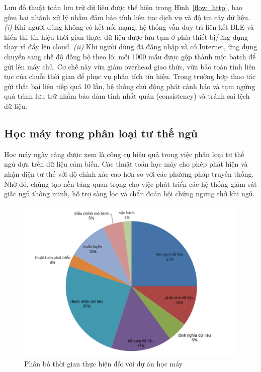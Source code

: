 Lưu đồ thuật toán lưu trữ dữ liệu được thể hiện trong Hình~\ref{flow_http}, bao gồm hai nhánh xử lý nhằm
đảm bảo tính liên tục dịch vụ và độ tin cậy dữ liệu. \textit{(i)} Khi người dùng không có kết nối
mạng, hệ thống vẫn duy trì liên kết BLE và hiển thị tín hiệu thời gian thực; dữ liệu được lưu tạm
ở phía thiết bị/ứng dụng thay vì đẩy lên cloud. \textit{(ii)} Khi người dùng đã đăng nhập và có Internet, ứng dụng chuyển sang
chế độ đồng bộ theo lô: mỗi 1000 mẫu được gộp thành một batch để gửi lên máy chủ. Cơ chế này vừa
giảm overhead giao thức, vừa bảo toàn tính liên tục của chuỗi thời gian để phục vụ phân tích tín hiệu.
Trong trường hợp thao tác gửi thất bại liên tiếp quá 10 lần, hệ thống chủ động phát cảnh báo và tạm
ngừng quá trình lưu trữ nhằm bảo đảm tính nhất quán (consistency) và tránh sai lệch dữ liệu.

\subsection{Học máy trong phân loại tư thế ngủ}
Học máy ngày càng được xem là công cụ hiệu quả trong việc phân loại tư thế ngủ dựa trên dữ liệu cảm biến. 
Các thuật toán học máy cho phép phát hiện và nhận diện tư thế với độ chính xác cao hơn so với các phương pháp truyền thống. 
Nhờ đó, chúng tạo nền tảng quan trọng cho việc phát triển các hệ thống giám sát giấc ngủ thông minh, hỗ trợ sàng lọc và chẩn đoán hội chứng ngưng thở khi ngủ. 

 

\begin{figure}[htbp]
\centering
\includegraphics[width=1\textwidth]{images/hocmay_time.png}
\caption{Phân bố thời gian thực hiện đối với dự án học máy}
\label{hocmay_time}
\end{figure}

